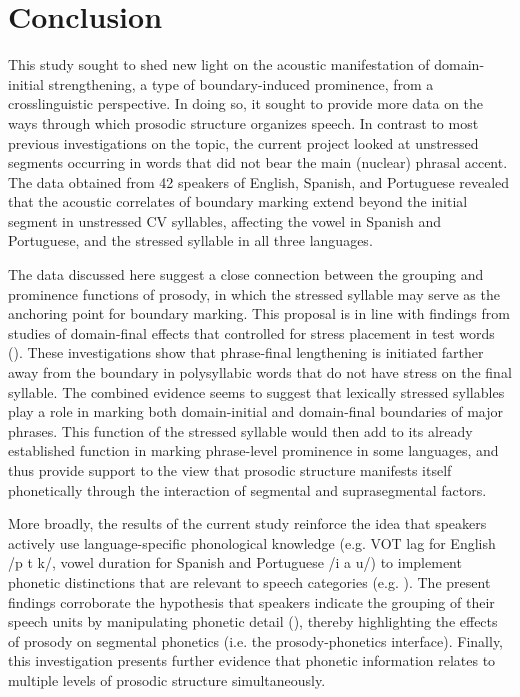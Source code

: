 \documentclass[output=paper]{langscibook}
\begin{document}
\section{Conclusion} 
This study sought to shed new light on the acoustic manifestation of domain-initial strengthening, a type of boundary-induced prominence, from a crosslinguistic perspective. In doing so, it sought to provide more data on the ways through which prosodic structure organizes speech. In contrast to most previous investigations on the topic, the current project looked at unstressed segments occurring in words that did not bear the main (nuclear) phrasal accent. The data obtained from 42 speakers of English, Spanish, and Portuguese revealed that the acoustic correlates of boundary marking extend beyond the initial segment in unstressed CV syllables, affecting the vowel in Spanish and Portuguese, and the stressed syllable in all three languages. 


The data discussed here suggest a close connection between the grouping and prominence functions of prosody, in which the stressed syllable may serve as the anchoring point for boundary marking. This proposal is in line with findings from studies of domain-final effects that controlled for stress placement in test words (\citealt{ts07, ckk13, k16}). These investigations show that phrase-final lengthening is initiated farther away from the boundary in polysyllabic words that do not have stress on the final syllable. The combined evidence seems to suggest that lexically stressed syllables play a role in marking both domain-initial and domain-final boundaries of major phrases. This function of the stressed syllable would then add to its already established function in marking phrase-level prominence in some languages, and thus provide support to the view that prosodic structure manifests itself phonetically through the interaction of segmental and suprasegmental factors. 

More broadly, the results of the current study reinforce the idea that speakers actively use language-specific phonological knowledge (e.g. VOT lag for English /p t k/, vowel duration for Spanish and Portuguese /i a u/) to implement phonetic distinctions that are relevant to speech categories (e.g. \citealt{kd94, cl99}). The present findings corroborate the hypothesis that speakers indicate the grouping of their speech units by manipulating phonetic detail (\citealt{c16}), thereby highlighting the effects of prosody on segmental phonetics (i.e. the prosody-phonetics interface). Finally, this investigation presents further evidence that phonetic information relates to multiple levels of prosodic structure simultaneously.
\end{document}
